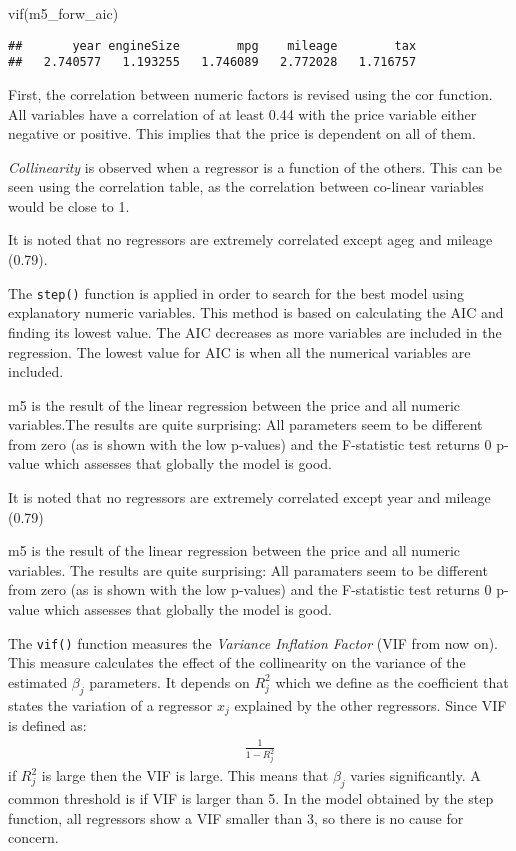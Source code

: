 \documentclass[
]{article}
\newenvironment{Shaded}{\begin{snugshade}}{\end{snugshade}}
\newcommand{\FunctionTok}[1]{\textcolor[rgb]{0.00,0.00,0.00}{#1}}
\newcommand{\NormalTok}[1]{#1}
\begin{document}
\begin{Shaded}
\begin{Highlighting}[]
\FunctionTok{vif}\NormalTok{(m5\_forw\_aic)}
\end{Highlighting}
\end{Shaded}

\begin{verbatim}
##       year engineSize        mpg    mileage        tax 
##   2.740577   1.193255   1.746089   2.772028   1.716757
\end{verbatim}

First, the correlation between numeric factors is revised using the cor
function. All variables have a correlation of at least 0.44 with the
price variable either negative or positive. This implies that the price
is dependent on all of them.

\textit{Collinearity} is observed when a regressor is a function of the
others. This can be seen using the correlation table, as the correlation
between co-linear variables would be close to 1.

It is noted that no regressors are extremely correlated except ageg and
mileage (0.79).

The \texttt{step()} function is applied in order to search for the best
model using explanatory numeric variables. This method is based on
calculating the AIC and finding its lowest value. The AIC decreases as
more variables are included in the regression. The lowest value for AIC
is when all the numerical variables are included.

m5 is the result of the linear regression between the price and all
numeric variables.The results are quite surprising: All parameters seem
to be different from zero (as is shown with the low p-values) and the
F-statistic test returns 0 p-value which assesses that globally the
model is good.

It is noted that no regressors are extremely correlated except year and
mileage (0.79)

m5 is the result of the linear regression between the price and all
numeric variables. The results are quite surprising: All paramaters seem
to be different from zero (as is shown with the low p-values) and the
F-statistic test returns 0 p-value which assesses that globally the
model is good.

The \texttt{vif()} function measures the
\textit{Variance Inflation Factor} (VIF from now on). This measure
calculates the effect of the collinearity on the variance of the
estimated \(\beta_j\) parameters. It depends on \(R_j^2\) which we
define as the coefficient that states the variation of a regressor
\(x_j\) explained by the other regressors. Since VIF is defined as:
\begin{align*}
  \frac{1}{1- R^2_j}
\end{align*} if \(R_j^2\) is large then the VIF is large. This means
that \(\beta_j\) varies significantly. A common threshold is if VIF is
larger than 5. In the model obtained by the step function, all
regressors show a VIF smaller than 3, so there is no cause for concern.
\end{document}
